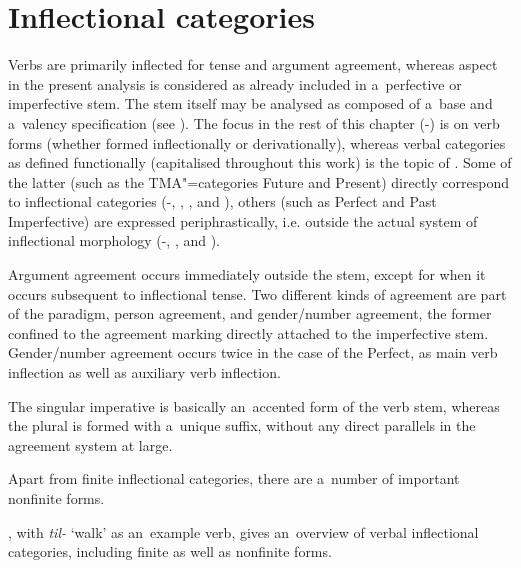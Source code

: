\section{Inflectional categories}
\label{sec:8-4}

Verbs are primarily inflected for tense and argument agreement, whereas aspect in the present analysis is considered as already included in a~perfective or imperfective stem. The stem itself may be analysed as composed of a~base and a~valency specification (see ). The focus in the rest of this chapter (-) is on verb forms (whether formed inflectionally or derivationally), whereas verbal categories as defined functionally (capitalised throughout this work) is the topic of . Some of the latter (such as the TMA"=categories Future and Present) directly correspond to inflectional categories (-, , , and ), others (such as Perfect and Past Imperfective) are expressed periphrastically, i.e. outside the actual system of inflectional morphology (-, , and ). 


Argument agreement occurs immediately outside the stem, except for when it occurs subsequent to inflectional tense. Two different kinds of agreement are part of the paradigm, person agreement, and gender/number agreement, the former confined to the agreement marking directly attached to the imperfective stem. Gender/number agreement occurs twice in the case of the Perfect, as main verb inflection as well as auxiliary verb inflection. 


The singular imperative is basically an~accented form of the verb stem, whereas the plural is formed with a~unique suffix, without any direct parallels in the agreement system at large.


Apart from finite inflectional categories, there are a~number of important nonfinite forms.


, with \textit{til-} `walk' as an~example verb, gives an~overview of verbal inflectional categories, including finite as well as nonfinite forms.



